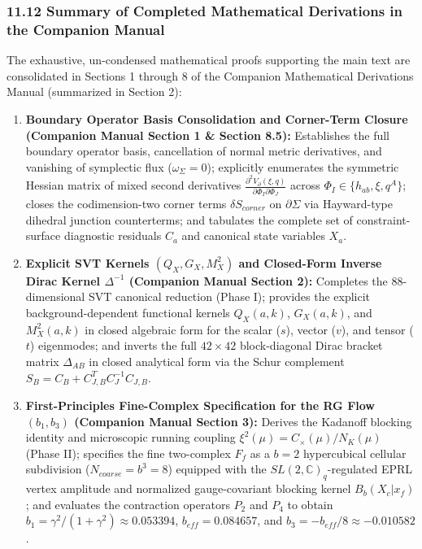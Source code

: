\documentclass[aps,prd,onecolumn,superscriptaddress,nofootinbib,longbibliography,10pt]{revtex4-2}
\begin{document}
  
  
\subsubsection*{11.12 Summary of Completed Mathematical Derivations in the Companion Manual}

  The exhaustive, un-condensed mathematical proofs supporting the main text are consolidated in Sections 1 through 8 of the Companion Mathematical Derivations Manual (summarized in Section 2):


  
\begin{enumerate}
    
\item \textbf{Boundary Operator Basis Consolidation and Corner-Term Closure (Companion Manual Section 1 \& Section 8.5):} Establishes the full boundary operator basis, cancellation of normal metric derivatives, and vanishing of symplectic flux (\(\omega_\Sigma = 0\)); explicitly enumerates the symmetric Hessian matrix of mixed second derivatives \(\frac{\partial^2 V_\partial(\xi,q)}{\partial\Phi_I \partial\Phi_J}\) across \(\Phi_I \in \{h_{ab}, \xi, q^A\}\); closes the codimension-two corner terms \(\delta S_{corner}\) on \(\partial\Sigma\) via Hayward-type dihedral junction counterterms; and tabulates the complete set of constraint-surface diagnostic residuals \(C_a\) and canonical state variables \(X_a\).
    
\item \textbf{Explicit SVT Kernels \((Q_X, G_X, M_X^2)\) and Closed-Form Inverse Dirac Kernel \(\Delta^{-1}\) (Companion Manual Section 2):} Completes the 88-dimensional SVT canonical reduction (Phase I); provides the explicit background-dependent functional kernels \(Q_X(a,k)\), \(G_X(a,k)\), and \(M_X^2(a,k)\) in closed algebraic form for the scalar (\(s\)), vector (\(v\)), and tensor (\(t\)) eigenmodes; and inverts the full \(42 \times 42\) block-diagonal Dirac bracket matrix \(\Delta_{AB}\) in closed analytical form via the Schur complement \(S_B = C_B + C_{J,B}^T C_J^{-1} C_{J,B}\).
    
\item \textbf{First-Principles Fine-Complex Specification for the RG Flow \((b_1, b_3)\) (Companion Manual Section 3):} Derives the Kadanoff blocking identity and microscopic running coupling \(\xi^2(\mu) = C_\times(\mu)/N_K(\mu)\) (Phase II); specifies the fine two-complex \(F_f\) as a \(b = 2\) hypercubical cellular subdivision (\(N_{coarse} = b^3 = 8\)) equipped with the \(SL(2,\mathbb{C})_q\)-regulated EPRL vertex amplitude and normalized gauge-covariant blocking kernel \(B_b(X_c|x_f)\); and evaluates the contraction operators \(P_2\) and \(P_4\) to obtain \(b_1 = \gamma^2/(1+\gamma^2) \approx 0.053394\), \(b_{eff} = 0.084657\), and \(b_3 = -b_{eff}/8 \approx -0.010582\).
    

\end{enumerate}
\end{document}

